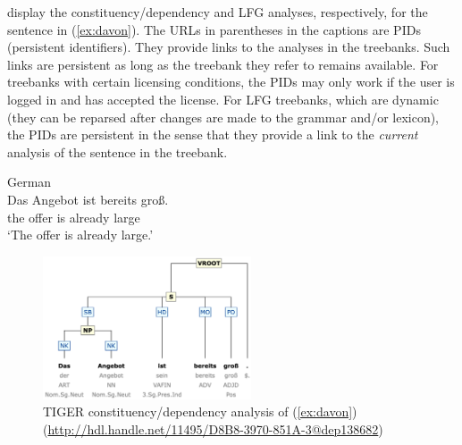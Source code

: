 \documentclass[output=paper,hidelinks]{langscibook}
\begin{document}



 display the constituency/dependency and LFG analyses, respectively, for the sentence in (\ref{ex:davon}). The URLs in parentheses in the captions are PIDs (persistent identifiers). They provide links to the analyses in the treebanks. Such links are persistent as long as the treebank they refer to remains available. For treebanks with certain licensing conditions, the PIDs may only work if the user is logged in and has accepted the license. For LFG treebanks, which are dynamic (they can be reparsed after changes are made to the grammar and/or lexicon), the PIDs are persistent in the sense that they provide a link to the \emph{current} analysis of the sentence in the treebank.

\ea German\\
\gll Das Angebot ist bereits groß.\\  
     the offer is already large\\ 
\glt `The offer is already large.'
\label{ex:davon}
\z

\begin{figure}
    \includegraphics[width=0.55\textwidth]{figures/Treebanks/Angebot-TIGER.png}
    \caption{TIGER constituency/dependency analysis of
      (\ref{ex:davon}) (\url{http://hdl.handle.net/11495/D8B8-3970-851A-3@dep138682})}
    \label{fig:davon-tiger}
\end{figure}
\end{document}
